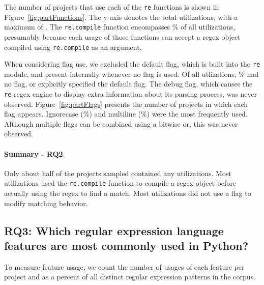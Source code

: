 

The number of projects that use each of the {\tt re} functions is shown in Figure~\ref{fig:partFunctions}.  The y-axis denotes the total utilizations, with a maximum of . The {\tt re.compile} function encompasses \% of all utilizations, presumably because each usage of those functions can accept a regex object compiled using {\tt re.compile} as an argument.

When considering flag use, we excluded the default flag, which is built into the {\tt re} module, and present internally whenever no flag is used.  Of all utlizations, \% had no flag, or explicitly specified the default flag.  The debug flag, which causes the {\tt re} regex engine to display extra information about its parsing process, was never observed.
 Figure~\ref{fig:partFlags} presents the number of projects in which each flag appears. Ignorecase (\%) and multiline (\%) were the most frequently used.   Although multiple flags can be combined using a bitwise or, this was never observed.


\paragraph{Summary - RQ2}

Only about half of the projects sampled contained any utilizations.  Most utilizations used the {\tt re.compile} function to compile a regex object before actually using the regex to find a match.  Most utilizations did not use a flag to modify matching behavior.





\subsection{RQ3: Which regular expression language features are most commonly used in Python?}
\label{results:rq3}

To measure feature usage, we  count the number of usages of each feature per project and as a percent of all distinct regular expression patterns in the corpus.



